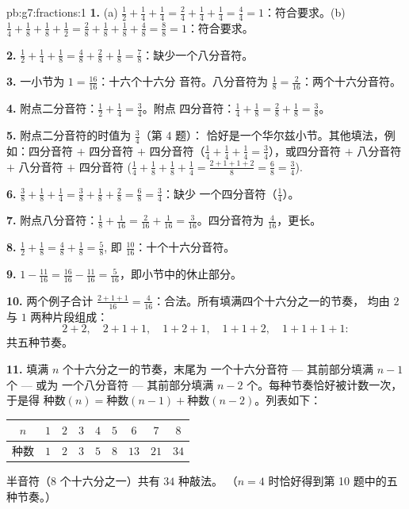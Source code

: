 \begin{solution}{pb:g7:fractions:1}
\textbf{1.} (a) $\frac12 + \frac14 + \frac14 = \frac24 + \frac14
+ \frac14 = \frac44 = 1$：符合要求。(b) $\frac14 + \frac18 +
\frac18 + \frac12 = \frac28 + \frac18 + \frac18 + \frac48 =
\frac88 = 1$：符合要求。

\textbf{2.} $\frac12 + \frac14 + \frac18 = \frac48 + \frac28 +
\frac18 = \frac78$：缺少一个八分音符。

\textbf{3.} 一小节为 $1 = \frac{16}{16}$：十六个十六分
音符。八分音符为 $\frac18 = \frac{2}{16}$：两个十六分音符。

\textbf{4.} 附点二分音符：$\frac12 + \frac14 = \frac34$。附点
四分音符：$\frac14 + \frac18 = \frac28 + \frac18 = \frac38$。

\textbf{5.} 附点二分音符的时值为 $\frac34$（第 4 题）：
恰好是一个华尔兹小节。其他填法，例如：四分音符
$+$ 四分音符 $+$ 四分音符（$\frac14 + \frac14 + \frac14 =
\frac34$），或四分音符 $+$ 八分音符 $+$ 八分音符 $+$ 四分音符
($\frac14 + \frac18 + \frac18 + \frac14 = \frac{2 + 1 + 1 +
2}{8} = \frac68 = \frac34$).

\textbf{6.} $\frac38 + \frac18 + \frac14 = \frac38 + \frac18 +
\frac28 = \frac68 = \frac34$：缺少
一个四分音符（$\frac14$）。

\textbf{7.} 附点八分音符：$\frac18 + \frac{1}{16} =
\frac{2}{16} + \frac{1}{16} = \frac{3}{16}$。四分音符为
$\frac{4}{16}$，更长。

\textbf{8.} $\frac12 + \frac18 = \frac48 + \frac18 = \frac58$,
即 $\frac{10}{16}$：十个十六分音符。

\textbf{9.} $1 - \frac{11}{16} = \frac{16}{16} - \frac{11}{16}
= \frac{5}{16}$，即小节中的休止部分。

\textbf{10.} 两个例子合计 $\frac{2 + 1 + 1}{16} =
\frac{4}{16}$：合法。所有填满四个十六分之一的节奏，
均由 $2$ 与 $1$ 两种片段组成：
\[
2{+}2, \quad 2{+}1{+}1, \quad 1{+}2{+}1, \quad 1{+}1{+}2, \quad
1{+}1{+}1{+}1 :
\]
共五种节奏。

\textbf{11.} 填满 $n$ 个十六分之一的节奏，末尾为
一个十六分音符 --- 其前部分填满 $n - 1$ 个 --- 或为
一个八分音符 --- 其前部分填满 $n - 2$ 个。每种节奏恰好被计数一次，
于是得
$\text{种数}(n) = \text{种数}(n-1) + \text{种数}(n-2)$。列表如下：
\begin{center}
\renewcommand{\arraystretch}{1.2}
\begin{tabular}{c|cccccccc}
$n$ & $1$ & $2$ & $3$ & $4$ & $5$ & $6$ & $7$ & $8$ \\
\hline
种数 & $1$ & $2$ & $3$ & $5$ & $8$ & $13$ & $21$ & $34$ \\
\end{tabular}
\end{center}
半音符（$8$ 个十六分之一）共有 $34$ 种敲法。
（$n = 4$ 时恰好得到第 10 题中的五种节奏。）


\end{solution}
